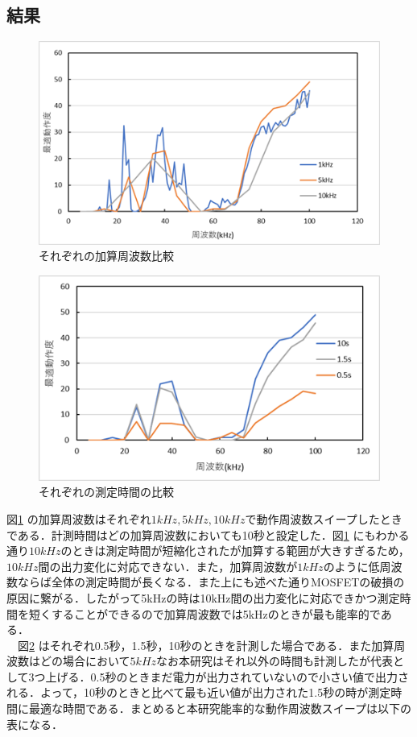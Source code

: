 \documentclass[12pt]{jarticle}
\begin{document}
\subsection{結果}
 \begin{figure}[H]
	\centering
	\includegraphics[]{hikakufre.png}
	\caption{それぞれの加算周波数比較}
	\label{fig:fre}
\end{figure}
\begin{figure}[H]
	\centering
	\includegraphics[]{hikakutime.png}
	\caption{それぞれの測定時間の比較}
\label{fig:time}
\end{figure}
図\ref{fig:fre} の加算周波数はそれぞれ$1kHz,5kHz,10kHz$で動作周波数スイープしたときである．計測時間はどの加算周波数においても10秒と設定した．図\ref{fig:fre} にもわかる通り$10kHz$のときは測定時間が短縮化されたが加算する範囲が大きすぎるため，$10kHz$間の出力変化に対応できない．また，加算周波数が$1kHz$のように低周波数ならば全体の測定時間が長くなる．また上にも述べた通りMOSFETの破損の原因に繋がる．したがって5kHzの時は10kHz間の出力変化に対応できかつ測定時間を短くすることができるので加算周波数では5kHzのときが最も能率的である．\\　図\ref{fig:time} はそれぞれ0.5秒，1.5秒，10秒のときを計測した場合である．また加算周波数はどの場合において$5kHz$なお本研究はそれ以外の時間も計測したが代表として3つ上げる．0.5秒のときまだ電力が出力されていないので小さい値で出力される．よって，10秒のときと比べて最も近い値が出力された1.5秒の時が測定時間に最適な時間である．まとめると本研究能率的な動作周波数スイープは以下の表になる．
\end{document}
